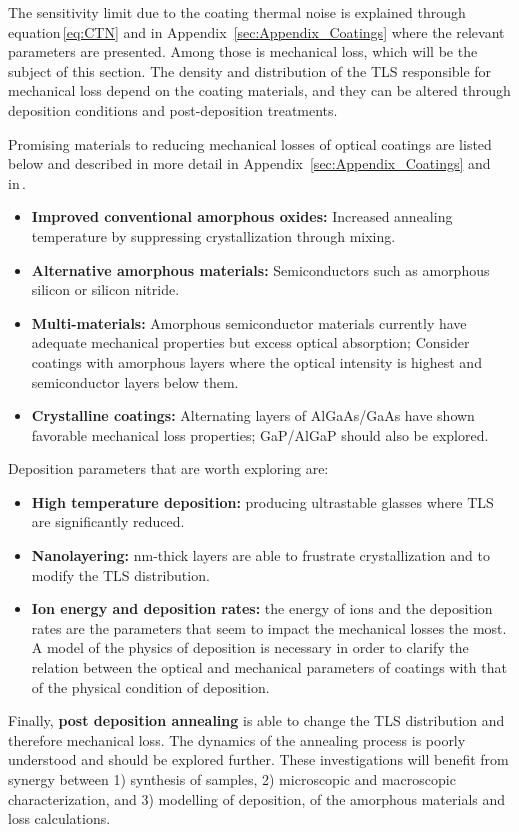 The sensitivity limit due to the coating thermal noise is explained through equation\,\ref{eq:CTN} and in Appendix~\ref{sec:Appendix_Coatings} where the relevant parameters are presented. Among those is mechanical loss, which will be the subject of this section. The density and distribution of the TLS responsible for mechanical loss depend on the coating materials, and they can be altered through deposition conditions and post-deposition treatments.

\noindent Promising materials to reducing mechanical losses of optical coatings are listed below and described in more detail in Appendix~\ref{sec:Appendix_Coatings} and in\,\cite{DawnIV2018}.
\begin{itemize}
    \item\textbf{Improved conventional amorphous oxides:} Increased annealing temperature by suppressing crystallization through mixing.
    \item\textbf{Alternative amorphous materials:} Semiconductors such as amorphous silicon or silicon nitride.
    \item\textbf{Multi-materials:} Amorphous semiconductor materials currently have adequate mechanical properties but excess optical absorption; Consider coatings with amorphous layers where the optical intensity is highest and semiconductor layers below them.
    \item\textbf{Crystalline coatings:} Alternating layers of AlGaAs/GaAs have shown favorable mechanical loss properties; GaP/AlGaP should also be explored.
\end{itemize}
Deposition parameters that are worth exploring are: 
\begin{itemize}
    \item\textbf{High temperature deposition:} producing ultrastable glasses where TLS are significantly reduced.
    \item\textbf{Nanolayering:} nm-thick layers are able to frustrate crystallization and to modify the TLS distribution.
    \item\textbf{Ion energy and deposition rates:} the energy of ions and the deposition rates are the parameters that seem to impact the mechanical losses the most. A model of the physics of deposition is necessary in order to clarify the relation between the optical and mechanical parameters of coatings with that of the physical condition of deposition.
\end{itemize}
Finally, \textbf{post deposition annealing} is able to change the TLS distribution and therefore mechanical loss. The dynamics of the annealing process is poorly understood and should be explored further.
These investigations will benefit from synergy between 1) synthesis of samples, 2) microscopic and macroscopic characterization, and 3) modelling of deposition, of the amorphous materials and loss calculations.

